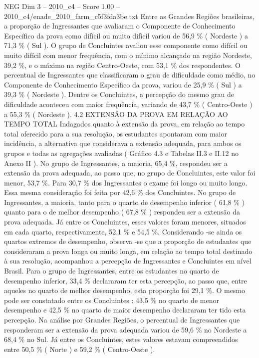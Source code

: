 \begin{textsample}{NEG Dim 3 – 2010\_c4 – Score 1.00 – 2010\_c4/enade\_2010\_farm\_c5f3fda3be.txt}
Entre as Grandes Regiões brasileiras, a proporção de Ingressantes que avaliaram o Componente de Conhecimento Específico da prova como difícil ou muito difícil variou de 56,9 \% ( Nordeste ) a 71,3 \% ( Sul ).
O grupo de Concluintes avaliou esse componente como difícil ou muito difícil com menor frequência, com o mínimo alcançado na região Nordeste, 39,2 \%, e o máximo na região Centro-Oeste, com 53,1 \% dos respondentes.
O percentual de Ingressantes que classificaram o grau de dificuldade como médio, no Componente de Conhecimento Específico da prova, variou de 25,9 \% ( Sul ) a 39,3 \% ( Nordeste ).
Dentre os Concluintes, a percepção do mesmo grau de dificuldade aconteceu com maior frequência, variando de 43,7 \% ( Centro-Oeste ) a 55,3 \% ( Nordeste ). 4.2 EXTENSÃO DA PROVA EM RELAÇÃO AO TEMPO TOTAL Indagados quanto à extensão da prova, em relação ao tempo total oferecido para a sua resolução, os estudantes apontaram com maior incidência, a alternativa que considerava a extensão adequada, para ambos os grupos e todas as agregações avaliadas ( Gráfico 4.3 e Tabelas II.3 e II.12 no Anexo II ).
No grupo de Ingressantes, a maioria, 65,4 \%, respondeu ser a extensão da prova adequada, ao passo que, no grupo de Concluintes, este valor foi menor, 53,7 \%.
Para 30,7 \% dos Ingressantes o exame foi longo ou muito longo.
Essa mesma consideração foi feita por 42,6 \% dos Concluintes.
No grupo de Ingressantes, a maioria, tanto para o quarto de desempenho inferior ( 61,8 \% ) quanto para o de melhor desempenho ( 67,8 \% ) respondeu ser a extensão da prova adequada.
Já entre os Concluintes, esses valores foram menores, situados em cada quarto, respectivamente, 52,1 \% e 54,5 \%.
Considerando -se ainda os quartos extremos de desempenho, observa -se que a proporção de estudantes que consideraram a prova longa ou muito longa, em relação ao tempo total destinado à sua resolução, acompanhou a percepção de Ingressantes e Concluintes em nível Brasil.
Para o grupo de Ingressantes, entre os estudantes no quarto de desempenho inferior, 33,4 \% declararam ter esta percepção, ao passo que, entre aqueles no quarto de melhor desempenho, esta proporção foi 29,1 \%.
O mesmo pode ser constatado entre os Concluintes : 43,5 \% no quarto de menor desempenho e 42,5 \% no quarto de maior desempenho declararam ter tido esta percepção.
Na análise por Grandes Regiões, o percentual de Ingressantes que responderam ser a extensão da prova adequada variou de 59,6 \% no Nordeste a 68,4 \% no Sul.
Já entre os Concluintes, estes valores estavam compreendidos entre 50,5 \% ( Norte ) e 59,2 \% ( Centro-Oeste ).

\end{textsample}
